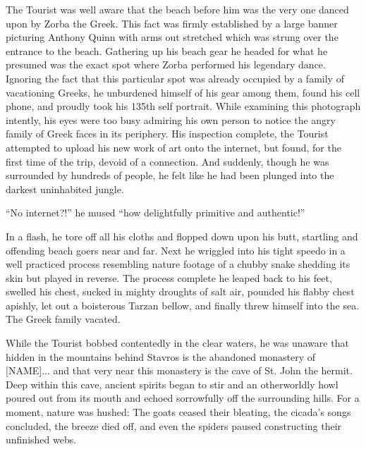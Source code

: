\documentclass[10pt,twoside,openright]{memoir}
\begin{document}
The Tourist was well aware that the beach before him was the very one danced upon by Zorba the Greek. This fact was firmly established by a large banner picturing Anthony Quinn with arms out stretched which was strung over the entrance to the beach. Gathering up his beach gear he headed for what he presumed was the exact spot where Zorba performed his legendary dance. Ignoring the fact that this particular spot was already occupied by a family of vacationing Greeks, he unburdened himself of his gear among them, found his cell phone, and proudly took his 135th self portrait. While examining this photograph intently, his eyes were too busy admiring his own person to notice the angry family of Greek faces in its periphery. His inspection complete, the Tourist attempted to upload his new work of art onto the internet, but found, for the first time of the trip, devoid of a connection. And suddenly, though he was surrounded by hundreds of people, he felt like he had been plunged into the darkest uninhabited jungle.

``No internet?!'' he mused ``how delightfully primitive and authentic!''

In a flash, he tore off all his cloths and flopped down upon his butt, startling and offending beach goers near and far. Next he wriggled into his tight speedo in a well practiced process resembling nature footage of a chubby snake shedding its skin but played in reverse. The process complete he leaped back to his feet, swelled his chest, sucked in mighty droughts of salt air, pounded his flabby chest apishly, let out a boisterous Tarzan bellow, and finally threw himself into the sea. The Greek family vacated.

While the Tourist bobbed contentedly in the clear waters, he was unaware that hidden in the mountains behind Stavros is the abandoned monastery of [NAME]... and that very near this monastery is the cave of St. John the hermit. Deep within this cave, ancient spirits began to stir and an otherworldly howl poured out from its mouth and echoed sorrowfully off the surrounding hills. For a moment, nature was hushed: The goats ceased their bleating, the cicada's songs concluded, the breeze died off, and even the spiders paused constructing their unfinished webs.
\end{document}
